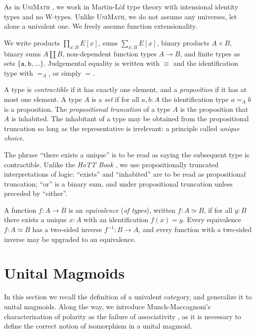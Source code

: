 \documentclass[runningheads]{llncs}
\makeatletter
\newcommand*{\chap}{Ch.\@}
\newcommand*\rocqlogo{\usebox{\rocqlogobox}}
\newcommand{\lemmaref}[3]{\href{https://github.com/UniMath/UniMath/blob/94fae0eda57a778cec704bfa73b4ff525c9bc475/#1\#L#2?name=#3}{\rocqlogo}}
\makeatother
\begin{document}
As in \textsc{UniMath} \cite{UniMath}, we work in Martin\hyp{}Löf
type theory \cite{MLTT79} with intensional identity types and no
W\hyp{}types. Unlike \textsc{UniMath}, we do not assume any
universes, let alone a univalent one. We freely assume function
extensionality.

We write products \(\prod_{x:B} E[x]\), sums \(\sum_{x:B} E[x]\),
binary products \(A \times B\), binary sums \(A \amalg B\),
non\hyp{}dependent function types \(A \to B\), and finite types as sets
\(\{\texttt{a},\texttt{b},\dots\}\). Judgemental equality is written with \(\equiv\) and
the identification type with \(=_A\), or simply \(=\).

A type is \emph{contractible} if it has exactly one element, and a
\emph{proposition} if it has at most one element. A type \(A\) is a \emph{set}
if for all \(a,b:A\) the identification type \(a =_A b\) is a
proposition. The \emph{propositional truncation} of a type \(A\) is the
proposition that \(A\) is inhabited. The inhabitant of a type may be
obtained from the propositional truncation so long as the
representative is irrelevant: a principle called \emph{unique choice}.

\begin{convention}
\label{con:proptrunc}
The phrase ``there exists a unique'' is to be read as saying the
subsequent type is contractible. Unlike the \emph{HoTT Book}
\cite{hottbook}, we use propositionally truncated interpretations of
logic: ``exists'' and ``inhabited'' are to be read as propositional
truncation; ``or'' is a binary sum, and under propositional truncation
unless preceded by ``either''.
\end{convention}

\begin{definition}[{\lemmaref{UniMath/Foundations/PartA.v}{1220}{isweq} \cite[\chap{} 4]{hottbook}}]
A function \(f \colon A \to B\) is an \emph{equivalence} (\emph{of types}), written \(f : A \simeq
B\), if for all \(y:B\) there exists a unique \(x:A\) with an
identification \(f(x)=y\). Every equivalence \(f : A \simeq B\) has a
two\hyp{}sided inverse \(f^{-1} \colon B \to A\), and every function with a
two\hyp{}sided inverse may be upgraded to an equivalence.
\end{definition}
\section{Unital Magmoids}
\label{sec:unital-magmoids}
\label{sec:firstbody}
In this section we recall the definition of a univalent category, and
generalize it to unital magmoids. Along the way, we introduce
Munch\hyp{}Maccagnoni's characterization of polarity as the failure of
associativity \cite{MunchMaccagnoni14,MunchMaccagnoni13}, as it is
necessary to define the correct notion of isomorphism in a unital
magmoid.
\end{document}
